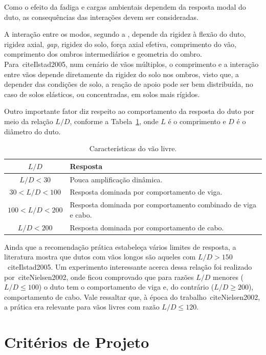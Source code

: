 Como o efeito da fadiga e cargas ambientais dependem da resposta modal do duto, as consequências das interações devem ser consideradas.

A interação entre os modos, segundo a , depende da rigidez à flexão do duto, rigidez axial, \textit{gap}, rigidez do solo, força axial efetiva, comprimento do vão, comprimento dos ombros intermediários e geometria do ombro.
Para~cite{Ilstad2005}, num cenário de vãos múltiplos, o comprimento e a interação entre vãos depende diretamente da rigidez do solo nos ombros, visto que, a depender das condições de solo, a reação de apoio pode ser bem distribuída, no caso de solos elásticos, ou concentradas, em solos mais rígidos.

Outro importante fator diz respeito ao comportamento da resposta do duto por meio da relação $L/D$, conforme a Tabela~\ref{tab:jdsn-caracvao}, onde $L$ é o comprimento e $D$ é o diâmetro do duto.

\begin{table}[ht!]
	\renewcommand{\arraystretch}{1.2}
 	\small
 	\centering
 	\caption{Características do vão livre.}
 	\label{tab:jdsn-caracvao}
 	\begin{tabular}{cl}
	 	\toprule
	 	$L/D$             & Resposta\\
	 	\midrule
	 	$L/D < 30$        & Pouca amplificação dinâmica. \\
	 	$30 < L/D < 100$  & Resposta dominada por comportamento de viga. \\
	 	$100 < L/D < 200$ & Resposta dominada por comportamento combinado de viga e cabo. \\
	 	$L/D < 200$       & Resposta dominada por comportamento de cabo. \\
	 	\bottomrule
 	\end{tabular}
\end{table}

Ainda que a recomendação prática estabeleça vários limites de resposta, a literatura mostra que dutos com vãos longos são aqueles com $L/D > 150$~cite{Ilstad2005}.
Um experimento interessante acerca dessa relação foi realizado por~cite{Nielsen2002}, onde ficou comprovado que para razões $L/D$ menores ($L/D \leq 100$) o duto tem o comportamento de viga e, do contrário ($L/D \geq 200$), comportamento de cabo.
Vale ressaltar que, à época do trabalho~cite{Nielsen2002}, a prática era relevante para vãos livres com razão $L/D \leq 120$.

\section{Critérios de Projeto}


